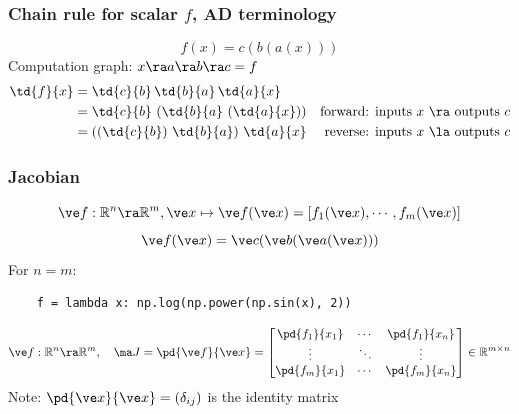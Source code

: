\documentclass[fleqn,10pt]{beamer}
\begin{document}
\begin{frame}
    \frametitle{Chain rule for scalar $f$, AD terminology}
    \begin{equation*}
        f(x) = c(b(a(x)))
    \end{equation*}
    Computation graph: $x\ra a\ra b\ra c = f$
    \begin{align*}
        \td{f}{x}
            &= \td{c}{b}\,\td{b}{a}\,\td{a}{x}&\\
            &= \td{c}{b}\,\left(\td{b}{a}\,\left(\td{a}{x}\right)\right)& \text{forward: inputs $x$ \ra outputs $c$}\\
            &= \left(\left(\td{c}{b}\right)\,\td{b}{a}\right)\,\td{a}{x}& \text{reverse: inputs $x$ \la outputs $c$}\\
    \end{align*}
\end{frame}


\begin{frame}[fragile]
    \frametitle{Jacobian}
    \begin{equation*}
        \ve f: \mathbb R^n \ra \mathbb R^m, \ve x\mapsto \ve f(\ve x) = \left[f_1(\ve x), \cdots, f_m(\ve x)\right]
    \end{equation*}
    \begin{equation*}
        \ve f(\ve x) = \ve c(\ve b(\ve a(\ve x)))
    \end{equation*}
    For $n=m$:
    \begin{verbatim}
    f = lambda x: np.log(np.power(np.sin(x), 2))
    \end{verbatim}

    \begin{equation*}
        \ve f: \mathbb R^n \ra \mathbb R^m,\quad \ma J
        = \pd{\ve f}{\ve x} =
        \begin{bmatrix}
            \pd{f_1}{x_1} & \cdots & \pd{f_1}{x_n}  \\
            \vdots        & \ddots & \vdots         \\
            \pd{f_m}{x_1} & \cdots & \pd{f_m}{x_n}
        \end{bmatrix}
        \in\mathbb R^{m\times n}
    \end{equation*}
    Note: $\pd{\ve x}{\ve x} = (\delta_{ij})$ is the identity matrix
\end{frame}

\newcommand{\edgecol}{
    \begin{equation*}
        \ve f: \mathbb R \ra \mathbb R^m\quad \ma J
        = \pd{\ve f}{x} =
        \begin{bmatrix}
            \pd{f_1}{x_1}  \\
            \vdots         \\
            \pd{f_m}{x_1}
        \end{bmatrix}
        = \ma J[:,1]\in\mathbb R^{m\times 1}
    \end{equation*}
}
\end{document}
